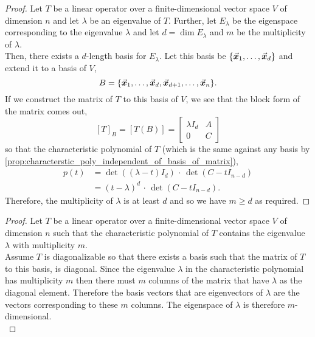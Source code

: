 \documentclass[../MathsNotesBase.tex]{subfiles}
\begin{document}
{		\bigskip
		\begin{proof}
			Let $T$ be a linear operator over a finite-dimensional vector space $V$ of dimension $n$ and let $\lambda$ be an eigenvalue of $T$. Further, let $E_\lambda$ be the eigenspace corresponding to the eigenvalue $\lambda$ and let ${ d = \dim E_\lambda }$ and $m$ be the multiplicity of $\lambda$.\\
			Then, there exists a $d$-length basis for $E_\lambda$. Let this basis be ${ \{ \vec{\bm{x}}_1, \dots, \vec{\bm{x}}_d \} }$ and extend it to a basis of $V$,
			\[ B = \{ \vec{\bm{x}}_1, \dots, \vec{\bm{x}}_d, \vec{\bm{x}}_{d + 1}, \dots, \vec{\bm{x}}_n \}. \]
			If we construct the matrix of $T$ \wrt to this basis of $V$, we see that the block form of the matrix comes out,
			\[
				[T]_B = [T(B)] = 	\begin{bmatrix}
										\lambda I_d & A\\
										0 & C
									\end{bmatrix}
			\]
			so that the characteristic polynomial of $T$ (which is the same against any basis by \autoref{prop:characterstic_poly_independent_of_basis_of_matrix}),
			\[\begin{aligned}
				p(t) &= \det ((\lambda - t)I_d) \, \cdot \, \det (C - t I_{n-d}) \\
				&= (t - \lambda)^d \, \cdot \, \det (C - t I_{n-d}).
			\end{aligned}\]
			Therefore, the multiplicity of $\lambda$ is at least $d$ and so we have ${ m \geq d }$ as required.
		\end{proof}
	
		\bigskip
		\begin{proof}
			Let $T$ be a linear operator over a finite-dimensional vector space $V$ of dimension $n$ such that the characteristic polynomial of $T$ contains the eigenvalue $\lambda$ with multiplicity $m$.\\
			
			Assume $T$ is diagonalizable so that there exists a basis such that the matrix of $T$ \wrt to this basis, is diagonal. Since the eigenvalue $\lambda$ in the characteristic polynomial has multiplicity $m$ then there must $m$ columns of the matrix that have $\lambda$ as the diagonal element. Therefore the basis vectors that are eigenvectors of $\lambda$ are the vectors corresponding to these $m$ columns. The eigenspace of $\lambda$ is therefore $m$-dimensional.\\
			

\end{proof}}
\end{document}
